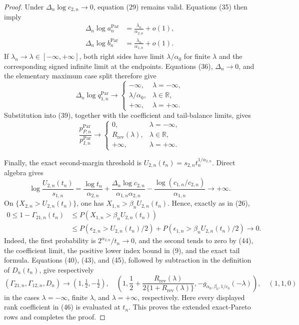 \documentclass{article}
\begin{document}
\begin{proof}
Under \(\Delta_n\log c_{2,n}\to0\), equation (29) remains valid. Equations
(35) then imply
\[
\begin{aligned}
\Delta_n\log a_n^{\mathrm{Par}}
&=\frac{\lambda_n}{\alpha_{2,n}}+o(1),\\
\Delta_n\log b_n^{\mathrm{Par}}
&=\frac{\lambda_n}{\alpha_{1,n}}+o(1).
\end{aligned}
\tag{41}
\]
If \(\lambda_n\to\lambda\in[-\infty,+\infty]\), both right sides have
limit \(\lambda/\alpha_0\) for finite \(\lambda\) and the corresponding
signed infinite limit at the endpoints. Equations (36),
\(\Delta_n\to0\), and the elementary maximum case split therefore give
\[
\Delta_n\log q_{1,n}^{\mathrm{Par}}
\longrightarrow
\begin{cases}
-\infty,&\lambda=-\infty,\\
\lambda/\alpha_0,&\lambda\in\mathbb R,\\
+\infty,&\lambda=+\infty.
\end{cases}
\tag{42}
\]
Substitution into (39), together with the coefficient and tail-balance limits,
gives
\[
\frac{p_{P,n}^{\mathrm{Par}}}{p_{I,n}^{\mathrm{Par}}}
\longrightarrow
\begin{cases}
0,&\lambda=-\infty,\\
R_{\mathrm{rev}}(\lambda),&\lambda\in\mathbb R,\\
+\infty,&\lambda=+\infty.
\end{cases}
\tag{43}
\]

Finally, the exact second-margin threshold is
\(U_{2,n}(t_n)=s_{2,n}t_n^{1/\alpha_{2,n}}\). Direct algebra gives
\[
\log\frac{U_{2,n}(t_n)}{s_{1,n}}
=\frac{\log t_n}{\alpha_{2,n}}
+\frac{\Delta_n\log c_{2,n}}{\alpha_{1,n}\alpha_{2,n}}
-\frac{\log(c_{1,n}/c_{2,n})}{\alpha_{1,n}}
\longrightarrow+\infty.
\tag{44}
\]
On \(\{X_{2,n}>U_{2,n}(t_n)\}\), one has
\(X_{1,n}>\beta_nU_{2,n}(t_n)\). Hence, exactly as in (26),
\[
\begin{aligned}
0\leq1-\Gamma_{21,n}(t_n)
&\leq P(X_{1,n}>\beta_nU_{2,n}(t_n))\\
&\leq P(\epsilon_{2,n}>U_{2,n}(t_n)/2)
+P(\epsilon_{1,n}>\beta_nU_{2,n}(t_n)/2)\longrightarrow0.
\end{aligned}
\tag{45}
\]
Indeed, the first probability is \(2^{\alpha_{2,n}}/t_n\to0\), and the
second tends to zero by (44), the coefficient limit, the positive lower index
bound in (9), and the exact tail formula. Equations (40), (43), and (45),
followed by subtraction in the definition of \(D_n(t_n)\), give respectively
\[
(\Gamma_{21,n},\Gamma_{12,n},D_n)
\longrightarrow(1,\tfrac12,-\tfrac12),
\quad
\left(1,\frac12+\frac{R_{\mathrm{rev}}(\lambda)}
{2\{1+R_{\mathrm{rev}}(\lambda)\}},
-g_{\alpha_0,\beta_0,1/c_0}(-\lambda)\right),
\quad
(1,1,0)
\tag{46}
\]
in the cases \(\lambda=-\infty\), finite \(\lambda\), and
\(\lambda=+\infty\), respectively. Here every displayed rank coefficient
in (46) is evaluated at \(t_n\). This proves the extended exact-Pareto rows and
completes the proof.
\end{proof}
\end{document}
